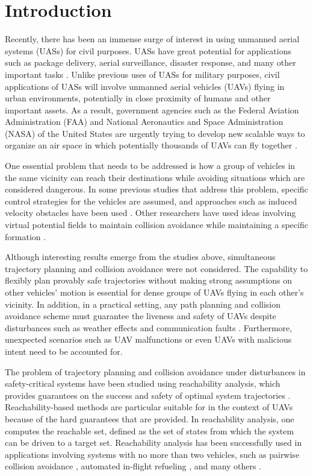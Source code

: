 \section{Introduction}
Recently, there has been an immense surge of interest in using unmanned aerial systems (UASs) for civil purposes. UASs have great potential for applications such as package delivery, aerial surveillance, disaster response, and many other important tasks \cite{Tice91, Debusk10, Amazon16, AUVSI16, BBC16}. Unlike previous uses of UASs for military purposes, civil applications of UASs will involve unmanned aerial vehicles (UAVs) flying in urban environments, potentially in close proximity of humans and other important assets. As a result, government agencies such as the Federal Aviation Administration (FAA) and National Aeronautics and Space Administration (NASA) of the United States are urgently trying to develop new scalable ways to organize an air space in which potentially thousands of UAVs can fly together \cite{FAA13, NASA16, Kopardekar16}.

One essential problem that needs to be addressed is how a group of vehicles in the same vicinity can reach their destinations while avoiding situations which are considered dangerous. In some previous studies that address this problem, specific control strategies for the vehicles are assumed, and approaches such as induced velocity obstacles have been used \cite{Fiorini98, Chasparis05, Vandenberg08}. Other researchers have used ideas involving virtual potential fields to maintain collision avoidance while maintaining a specific formation \cite{Saber02, Chuang07}. 

Although interesting results emerge from the studies above, simultaneous trajectory planning and collision avoidance were not considered. The capability to flexibly plan provably safe trajectories without making strong assumptions on other vehicles' motion is essential for dense groups of UAVs flying in each other's vicinity. In addition, in a practical setting, any path planning and collision avoidance scheme must guarantee the liveness and safety of UAVs despite disturbances such as weather effects and communication faults \cite{} . Furthermore, unexpected scenarios such as UAV malfunctions or even UAVs with malicious intent need to be accounted for.

The problem of trajectory planning and collision avoidance under disturbances in safety-critical systems have been studied using reachability analysis, which provides guarantees on the success and safety of optimal system trajectories \cite{Barron90, Mitchell05, Bokanowski10, Bokanowski11, Margellos11, Fisac15}. Reachability-based methods are particular suitable for in the context of UAVs because of the hard guarantees that are provided. In reachability analysis, one computes the reachable set, defined as the set of states from which the system can be driven to a target set. Reachability analysis has been successfully used in applications involving systems with no more than two vehicles, such as pairwise collision avoidance \cite{Mitchell05}, automated in-flight refueling \cite{Ding08}, and many others \cite{Huang11, Bayen07}. 

